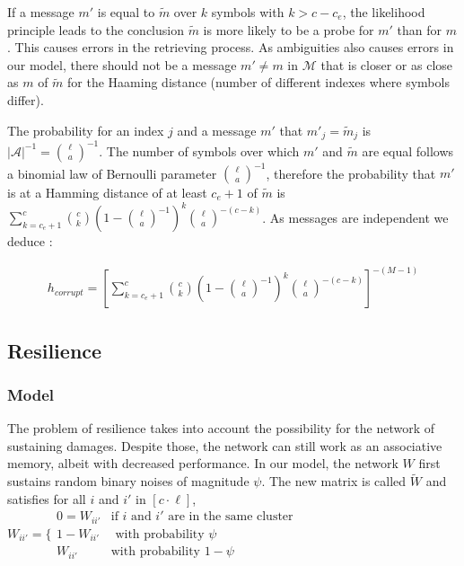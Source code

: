 \documentclass[english,10pt,twocolumn]{IEEEtran}
\theoremstyle{definition}
\begin{document}
	If a message $m'$ is equal to $\tilde{m}$ over $k$ symbols with $k > c - c_e$, the likelihood principle leads to the conclusion $\tilde{m}$ is more likely to be a probe for $m'$ than for $m$. This causes errors in the retrieving process. As ambiguities also causes errors in our model, there should not be a message $m' \neq m$ in $\mathcal{M}$ that is closer or as close as $m$ of $\tilde{m}$ for the Haaming distance (number of different indexes where symbols differ).
	
	The probability for an index $j$ and a message $m'$ that $m'_j = \tilde{m}_j$ is $|\mathcal{A}|^{-1} = \binom{\ell}{a}^{-1}$. The number of symbols over which $m'$ and $\tilde{m}$ are equal follows a binomial law of Bernoulli parameter $\binom{\ell}{a}^{-1}$, therefore the probability that $m'$ is at a Hamming distance of at least $c_e +1$ of $\tilde{m}$ is $ \sum_{k=c_e+1}^c \binom{c}{k} \left (1-{\ell \choose a}^{-1} \right )^k {\ell \choose a}^{-(c-k)}$. As messages are independent we deduce :
	
	\begin{align}
	h_{corrupt} = \left [\sum_{k=c_e+1}^c \binom{c}{k} \left (1-{\ell \choose a}^{-1} \right )^k {\ell \choose a}^{-(c-k)} \right ] ^{-(M-1)}
	\end{align}	
	
		
	\subsection{Resilience}
	
	\subsubsection{Model}
	
	The problem of resilience takes into account the possibility for the network of sustaining damages. Despite those, the network can still work as an associative memory, albeit with decreased performance. In our model, the network $W$ first sustains random binary noises of magnitude $\psi$. The new matrix is called $\tilde{W}$ and satisfies for all $i$ and $i'$ in $[c \cdot \ell ]$, $W_{ii'} = \Bigg \{ \begin{array}{ll}
	0 = W_{ii'} & \mbox{if $i$ and $i'$ are in the same cluster}\\
	1-W_{ii'} & \mbox{ with probability }  \psi\\
	W_{ii'} & \mbox{with probability } 1 - \psi\end{array}$
	
\end{document}
